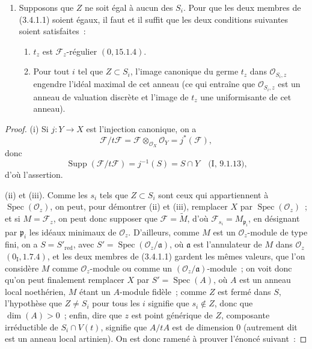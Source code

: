 \begin{enumerate}
\item[(iii)] Supposons que $Z$ ne soit égal à aucun des $S_i$. Pour que les
deux membres de (3.4.1.1) soient égaux, il faut et il suffit que les deux
conditions suivantes soient satisfaites~:
\begin{enumerate}
\item[$\alpha$)] $t_z$ est $\mathcal F_z$-régulier $(0,15.1.4)$.
\item[$\beta$)] Pour tout $i$ tel que $Z\subset S_i$, l'image canonique du
germe $t_z$ dans $\mathcal O_{S_i,z}$ engendre l'idéal maximal de cet anneau
(ce qui entraîne que $\mathcal O_{S_i,z}$ est un anneau de valuation discrète
et l'image de $t_z$ une uniformisante de cet anneau).
\end{enumerate}
\end{enumerate}

\begin{proof}
(i) Si $j:Y\to X$ est l'injection canonique, on a
\[
\mathcal F/t\mathcal F
=\mathcal F\otimes_{\mathcal O_X}\mathcal O_Y
=j^*(\mathcal F),
\]
donc
\[
\operatorname{Supp}(\mathcal F/t\mathcal F)
=j^{-1}(S)=S\cap Y
\quad\text{(I, 9.1.13),}
\]
d'où l'assertion.

(ii) et (iii). Comme les $s_i$ tels que $Z\subset S_i$ sont ceux qui
appartiennent à $\operatorname{Spec}(\mathcal O_z)$, on peut, pour démontrer
(ii) et (iii), remplacer $X$ par $\operatorname{Spec}(\mathcal O_z)$~; et si
$M=\mathcal F_z$, on peut donc supposer que $\mathcal F=\widetilde M$, d'où
$\mathcal F_{s_i}=M_{\mathfrak p_i}$, en désignant par $\mathfrak p_i$ les
idéaux minimaux de $\mathcal O_z$. D'ailleurs, comme $M$ est un
$\mathcal O_z$-module de type fini, on a $S=S'_{\mathrm{red}}$, avec
$S'=\operatorname{Spec}(\mathcal O_z/\mathfrak a)$, où $\mathfrak a$ est
l'annulateur de $M$ dans $\mathcal O_z$ $(0_{\mathrm I},1.7.4)$, et les deux
membres de (3.4.1.1) gardent les mêmes valeurs, que l'on considère $M$ comme
$\mathcal O_z$-module ou comme un $(\mathcal O_z/\mathfrak a)$-module~; on voit
donc qu'on peut finalement remplacer $X$ par $S'=\operatorname{Spec}(A)$, où
$A$ est un anneau local noethérien, $M$ étant un $A$-module fidèle~; comme $Z$
est fermé dans $S$, l'hypothèse que $Z\neq S_i$ pour tous les $i$ signifie que
$s_i\notin Z$, donc que $\dim(A)>0$~; enfin, dire que $z$ est point générique
de $Z$, composante irréductible de $S_i\cap V(t)$, signifie que $A/tA$ est de
dimension $0$ (autrement dit est un anneau local artinien). On est donc ramené
à prouver l'énoncé suivant~:
\end{proof}

